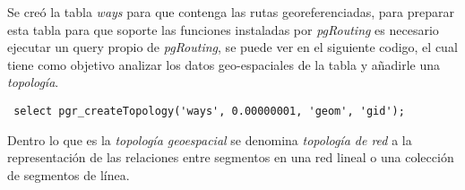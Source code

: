 %




Se creó la tabla \emph{ways} para que contenga las rutas georeferenciadas, para preparar esta tabla para que soporte las funciones instaladas por \emph{pgRouting} es necesario ejecutar un query propio de \emph{pgRouting}, se puede ver en el siguiente codigo, el cual tiene como objetivo analizar los datos geo-espaciales de la tabla y añadirle una \emph{topología}.\\


\begin{verbatim}
 select pgr_createTopology('ways', 0.00000001, 'geom', 'gid');
\end{verbatim}

Dentro lo que es la \emph{topología geoespacial} se denomina \emph{topología de red} a la representación de las relaciones entre segmentos en una red lineal o una colección de segmentos de línea. \cite{osgeo_journal_topology} \\

